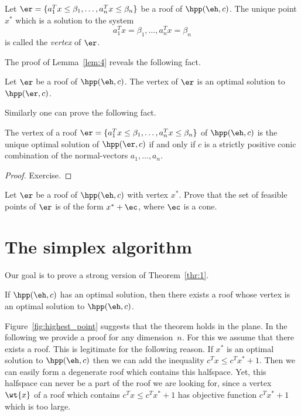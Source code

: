 \begin{definition}
  \label{def:5}
  Let $\er = \{a_1^Tx\leq\beta_1,\ldots,a_n^Tx\leq\beta_n\}$ be a roof of
  $\hpp(\eh,c)$. The unique point $x^*$  which is a solution to the
  system 
  \begin{equation}
    \label{eq:3}
    a_1^Tx=\beta_1,\ldots,a_n^Tx=\beta_n
  \end{equation}
  is called the \emph{vertex} of $\er$. 
\end{definition}


The proof of Lemma~\ref{lem:4} reveals the following fact. 

\begin{proposition}
\label{prop:1}
Let $\er$ be a roof of $\hpp(\eh,c)$. The vertex of $\er$ is an
optimal solution to $\hpp(\er,c)$.
\end{proposition}


Similarly one can prove the following fact. 

\begin{proposition}
  \label{prop:2}
    The vertex of a   roof $\er = \{a_1^Tx\leq\beta_1,\ldots,a_n^Tx\leq\beta_n\}$   of $\hpp(\eh,c)$ 
    is the unique optimal solution of $\hpp(\er,c)$ if and only 
    if $c$ is a strictly positive conic combination  of 
    the normal-vectors $a_1,\ldots,a_n$. 
\end{proposition}

\begin{proof}
  Exercise.
\end{proof}


\begin{exercise}
  \label{sec:high-point-probl}
  Let $\er$ be a roof of $\hpp(\eh,c)$ with vertex $x^*$. Prove
  that the set of  feasible points of $\er$ is of the form 
  $x^* + \ec$, where $\ec$ is a cone. 
\end{exercise}


\section{The simplex algorithm}
\label{sec:simplex-algorithm}



Our goal is to prove  a strong version of Theorem~\ref{thr:1}. 

\begin{theorem}
  \label{thr:5}
  If $\hpp(\eh,c)$ has an optimal solution, then there exists a
  roof whose vertex is an optimal solution to $\hpp(\eh,c)$. 
\end{theorem}
Figure~\ref{fig:highest_point} suggests that the theorem holds in the
plane. In the following we provide a proof for any dimension~$n$. For
this we assume that there exists a roof. This is legitimate for the
following reason. If $x^*$ is an optimal solution to $\hpp(\eh,c)$
then we can add the inequality $c^Tx \leq c^Tx^*+1$. Then we can easily
form a degenerate roof which contains this halfspace. Yet, this
halfspace can never be a part of the roof we are looking for, since
a vertex $\wt{x}$  of a roof which contains $c^Tx \leq c^Tx^*+1$  has
objective function $c^Tx^*+1$ which is too large. 


